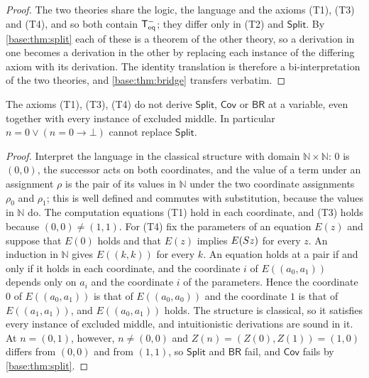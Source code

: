 \begin{proof}
The two theories share the logic, the language and the axioms (T1), (T3)
and (T4), and so both contain $\mathsf{T}_{\mathrm{eq}}^{-}$; they differ only in (T2) and
$\mathsf{Split}$.  By \cref{base:thm:split} each of these is a theorem of
the other theory, so a derivation in one becomes a derivation in the other
by replacing each instance of the differing axiom with its derivation.  The identity translation is therefore
a bi-interpretation of the two theories, and \cref{base:thm:bridge} transfers
verbatim.
\end{proof}

\begin{proposition}
\label{base:prop:split-indep}
The axioms (T1), (T3), (T4) do not derive $\mathsf{Split}$, $\mathsf{Cov}$ or
$\mathsf{BR}$ at a variable, even together with every instance of excluded
middle.  In particular $n=0\vee(n=0\to\bot)$ cannot replace $\mathsf{Split}$.
\end{proposition}

\begin{proof}
Interpret the language in the classical structure with domain
$\mathbb N\times\mathbb N$: $0$ is $(0,0)$, the successor acts on both
coordinates, and the value of a term under an assignment $\rho$ is the pair
of its values in $\mathbb N$ under the two coordinate assignments $\rho_0$
and $\rho_1$; this is well defined and commutes with substitution, because
the values in $\mathbb N$ do.  The computation equations (T1) hold in each
coordinate, and (T3) holds because $(0,0)\neq(1,1)$.  For (T4) fix the
parameters of an equation $E(z)$ and suppose that $E(0)$ holds and that
$E(z)$ implies $E(S z)$ for every $z$.  An induction in $\mathbb N$ gives
$E((k,k))$ for every $k$.  An equation holds at a pair if and only if it
holds in each coordinate, and the coordinate $i$ of $E((a_0,a_1))$ depends
only on $a_i$ and the coordinate $i$ of the parameters.  Hence the
coordinate $0$ of $E((a_0,a_1))$ is that of $E((a_0,a_0))$ and the
coordinate $1$ is that of $E((a_1,a_1))$, and $E((a_0,a_1))$ holds.  The
structure is classical, so it satisfies every instance of excluded middle,
and intuitionistic derivations are sound in it.  At $n=(0,1)$, however,
$n\neq(0,0)$ and $Z(n)=(Z(0),Z(1))=(1,0)$ differs from $(0,0)$ and from
$(1,1)$, so $\mathsf{Split}$ and $\mathsf{BR}$ fail, and $\mathsf{Cov}$ fails
by \cref{base:thm:split}.
\end{proof}

